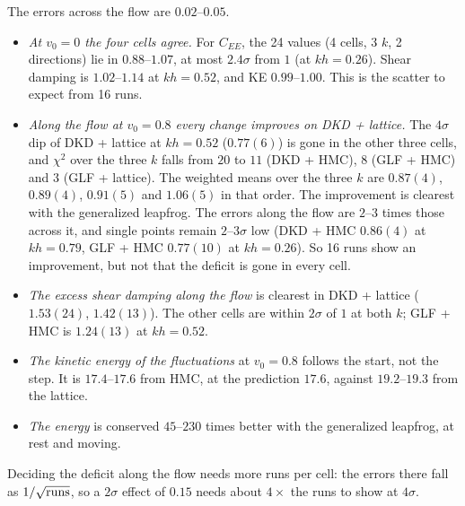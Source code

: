 \documentclass[11pt,aps,preprint,nofootinbib,superscriptaddress,tightenlines]{revtex4-2}
\begin{document}
The errors across the flow are $0.02$--$0.05$.
\begin{itemize}
\item \emph{At $v_0=0$ the four cells agree.}  For $C_{EE}$, the 24 values (4 cells, 3 $k$, 2 directions) lie in $0.88$--$1.07$, at most
  $2.4\sigma$ from $1$ (at $kh=0.26$).  Shear damping is $1.02$--$1.14$ at $kh=0.52$, and KE $0.99$--$1.00$.  This is the scatter to expect
  from 16 runs.
\item \emph{Along the flow at $v_0=0.8$ every change improves on DKD + lattice.}  The $4\sigma$ dip of DKD + lattice at $kh=0.52$ ($0.77(6)$)
  is gone in the other three cells, and $\chi^2$ over the three $k$ falls from $20$ to $11$ (DKD + HMC), $8$ (GLF + HMC) and $3$ (GLF + lattice).
  The weighted means over the three $k$ are $0.87(4)$, $0.89(4)$, $0.91(5)$ and $1.06(5)$ in that order.  The improvement is clearest with the
  generalized leapfrog.  The errors along the flow are $2$--$3$ times those across it, and single points remain $2$--$3\sigma$ low (DKD + HMC
  $0.86(4)$ at $kh=0.79$, GLF + HMC $0.77(10)$ at $kh=0.26$).  So 16 runs show an improvement, but not that the deficit is gone in every cell.
\item \emph{The excess shear damping along the flow} is clearest in DKD + lattice ($1.53(24)$, $1.42(13)$).  The other cells are within
  $2\sigma$ of $1$ at both $k$; GLF + HMC is $1.24(13)$ at $kh=0.52$.
\item \emph{The kinetic energy of the fluctuations} at $v_0=0.8$ follows the start, not the step.  It is $17.4$--$17.6$ from HMC, at the
  prediction $17.6$, against $19.2$--$19.3$ from the lattice.
\item \emph{The energy} is conserved $45$--$230$ times better with the generalized leapfrog, at rest and moving.
\end{itemize}
Deciding the deficit along the flow needs more runs per cell: the errors there fall as $1/\sqrt{\rm runs}$, so a $2\sigma$ effect of
$0.15$ needs about $4\times$ the runs to show at $4\sigma$.
\end{document}
